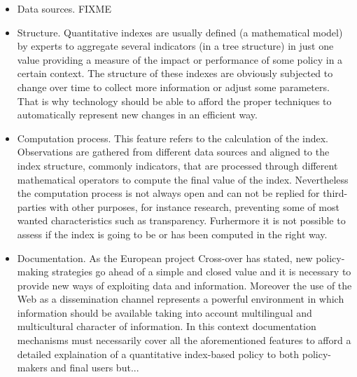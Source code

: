 \documentclass{llncs}
\begin{document}
\begin{itemize}
 \item Data sources. FIXME
 
 \item Structure. Quantitative indexes are usually defined (a mathematical model) by experts to aggregate several indicators (in a tree structure) in just one value providing 
 a measure of the impact or performance of some policy in a certain context. The structure of these indexes are obviously subjected to change over time 
 to collect more information or adjust some parameters. That is why technology should be able to afford the proper techniques 
 to automatically represent new changes in an efficient way.
 
  \item Computation process. This feature refers to the calculation of the index. Observations are gathered from different data sources and aligned 
  to the index structure, commonly indicators, that are processed through different mathematical operators to compute the final value of the index. 
  Nevertheless the computation process is not always open and can not be replied for third-parties with other purposes, for instance research, preventing some 
  of most wanted characteristics such as transparency. Furhermore it is not possible to assess if the index is going to be or has been computed in 
  the right way.
  
  \item Documentation. As the European project Cross-over has stated, new policy-making strategies go ahead of a simple and closed value and it is necessary to provide 
  new ways of exploiting data and information. Moreover the use of the Web as a dissemination channel represents a powerful environment in which 
  information should be available taking into account multilingual and multicultural character of information. In this context documentation mechanisms 
  must necessarily cover all the aforementioned features to afford a detailed explaination of a quantitative index-based policy to both policy-makers 
  and final users but...
\end{itemize}
\end{document}
